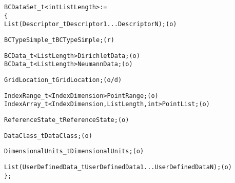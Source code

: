 \begin{alltt}
  BCDataSet\_t< int ListLength > :=
    \{
    List( Descriptor\_t Descriptor1 ... DescriptorN ) ;                      (o)

    BCTypeSimple\_t BCTypeSimple ;                                           (r)

    BCData\_t<ListLength> DirichletData ;                                    (o)
    BCData\_t<ListLength> NeumannData ;                                      (o)

    GridLocation\_t GridLocation ;                                           (o/d)

    IndexRange\_t<IndexDimension> PointRange ;                               (o)
    IndexArray\_t<IndexDimension, ListLength, int> PointList ;               (o)

    ReferenceState\_t ReferenceState ;                                       (o)

    DataClass\_t DataClass ;                                                 (o)
                
    DimensionalUnits\_t DimensionalUnits ;                                   (o)

    List( UserDefinedData\_t UserDefinedData1 ... UserDefinedDataN ) ;       (o)
    \} ;
\end{alltt}

